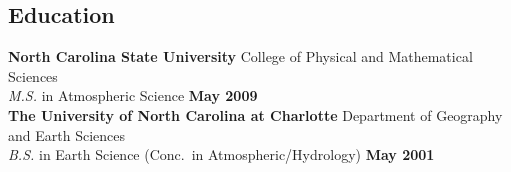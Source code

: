 \documentclass[margin,line]{resume}
\begin{document}
\begin{resume}



\section{\mysidestyle Education}

\textbf{North Carolina State University} College of Physical and Mathematical Sciences\\
\textsl{M.S.} in Atmospheric Science \hfill \textbf{May 2009}\vspace{3mm}\\
\textbf{The University of North Carolina at Charlotte} Department of Geography and Earth Sciences\\
\textsl{B.S.} in Earth Science (Conc.\ in Atmospheric/Hydrology) \hfill \textbf{May 2001}





\end{resume}
\end{document}
